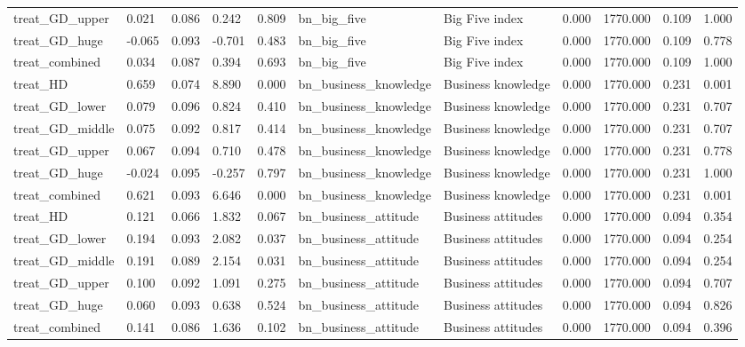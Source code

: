 \begin{tabular}{lllllllllll}
treat\_GD\_upper & 0.021 & 0.086 & 0.242 & 0.809 & bn\_big\_five & Big Five index & 0.000 & 1770.000 & 0.109 & 1.000 \\
treat\_GD\_huge & -0.065 & 0.093 & -0.701 & 0.483 & bn\_big\_five & Big Five index & 0.000 & 1770.000 & 0.109 & 0.778 \\
treat\_combined & 0.034 & 0.087 & 0.394 & 0.693 & bn\_big\_five & Big Five index & 0.000 & 1770.000 & 0.109 & 1.000 \\
treat\_HD & 0.659 & 0.074 & 8.890 & 0.000 & bn\_business\_knowledge & Business knowledge & 0.000 & 1770.000 & 0.231 & 0.001 \\
treat\_GD\_lower & 0.079 & 0.096 & 0.824 & 0.410 & bn\_business\_knowledge & Business knowledge & 0.000 & 1770.000 & 0.231 & 0.707 \\
treat\_GD\_middle & 0.075 & 0.092 & 0.817 & 0.414 & bn\_business\_knowledge & Business knowledge & 0.000 & 1770.000 & 0.231 & 0.707 \\
treat\_GD\_upper & 0.067 & 0.094 & 0.710 & 0.478 & bn\_business\_knowledge & Business knowledge & 0.000 & 1770.000 & 0.231 & 0.778 \\
treat\_GD\_huge & -0.024 & 0.095 & -0.257 & 0.797 & bn\_business\_knowledge & Business knowledge & 0.000 & 1770.000 & 0.231 & 1.000 \\
treat\_combined & 0.621 & 0.093 & 6.646 & 0.000 & bn\_business\_knowledge & Business knowledge & 0.000 & 1770.000 & 0.231 & 0.001 \\
treat\_HD & 0.121 & 0.066 & 1.832 & 0.067 & bn\_business\_attitude & Business attitudes & 0.000 & 1770.000 & 0.094 & 0.354 \\
treat\_GD\_lower & 0.194 & 0.093 & 2.082 & 0.037 & bn\_business\_attitude & Business attitudes & 0.000 & 1770.000 & 0.094 & 0.254 \\
treat\_GD\_middle & 0.191 & 0.089 & 2.154 & 0.031 & bn\_business\_attitude & Business attitudes & 0.000 & 1770.000 & 0.094 & 0.254 \\
treat\_GD\_upper & 0.100 & 0.092 & 1.091 & 0.275 & bn\_business\_attitude & Business attitudes & 0.000 & 1770.000 & 0.094 & 0.707 \\
treat\_GD\_huge & 0.060 & 0.093 & 0.638 & 0.524 & bn\_business\_attitude & Business attitudes & 0.000 & 1770.000 & 0.094 & 0.826 \\
treat\_combined & 0.141 & 0.086 & 1.636 & 0.102 & bn\_business\_attitude & Business attitudes & 0.000 & 1770.000 & 0.094 & 0.396 \\
\bottomrule
\end{tabular}
